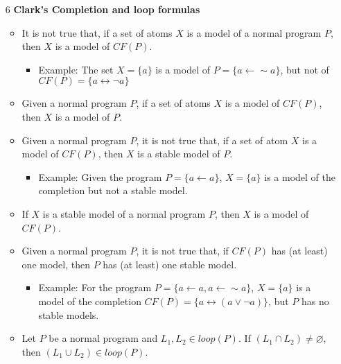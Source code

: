 \documentclass[9pt,a4paper,landscape]{article}
\begin{document}
{\begin{itemize}
	\item[6] \textbf{Clark's Completion and loop formulas}
	\begin{itemize}[noitemsep]
		\item It is not true that, if a set of atoms $X$ is a model of a normal program $P$, then $X$ is a model of $CF(P)$.
		\begin{itemize}[noitemsep]
			\item Example: The set $X = \{a\}$ is a model of $P = \{a \leftarrow {\sim} a\}$, but not of  $CF(P) = \{a \leftrightarrow \neg a\}$
		\end{itemize}
		\item Given a normal program $P$, if a set of atoms $X$ is a model of $CF(P)$, then $X$ is a model of $P$.
		\item Given a normal program $P$, it is not true that, if a set of atom $X$ is a model of $CF(P)$, then $X$ is a stable model of $P$.
		\begin{itemize}[noitemsep]
			\item Example: Given the program $P = \{a \leftarrow a\}$, $X = \{a\}$ is a model of the completion but not a stable model.
		\end{itemize}
		\item If $X$ is a stable model of a normal program $P$, then $X$ is a model of $CF(P)$.
		\item Given a normal program $P$, it is not true that, if $CF(P)$ has (at least) one model, then $P$ has (at least) one stable model.
		\begin{itemize}[noitemsep]
			\item Example: For the program $P = \{a \leftarrow a, a \leftarrow {\sim} a\}$, $X = \{a\}$ is a model of the completion $CF(P) = \{a \leftrightarrow (a \lor \neg a)\}$, but $P$ has no stable models.
		\end{itemize}
		\item Let $P$ be a normal program and $L_1, L_2 \in loop(P)$. If $(L_1 \cap L_2) \neq \varnothing$, then $(L_1 \cup L_2) \in loop(P)$.
	\end{itemize}
	

\end{itemize}}
\end{document}
